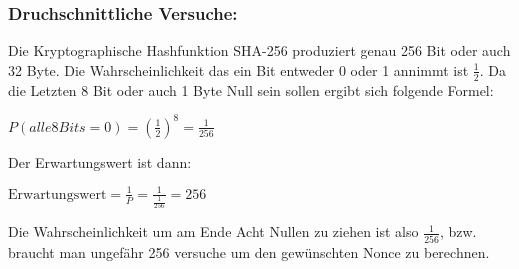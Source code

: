 \subsubsection*{Druchschnittliche Versuche:}

Die Kryptographische Hashfunktion SHA-256 produziert genau 256 Bit oder auch 32 Byte. Die Wahrscheinlichkeit das ein Bit entweder 0 oder 1 annimmt ist $\frac{1}{2}$. Da die Letzten 8 Bit oder auch 1 Byte Null sein sollen ergibt sich folgende Formel:\\

\begin{center}
$P(alle 8 Bits = 0)=(\frac{1}{2})^8 = \frac{1}{256}$
\end{center}

Der Erwartungswert ist dann:

\begin{center}
$\text{Erwartungswert}=\frac{1}{P}= \frac{1}{\frac{1}{256}} = 256$
\end{center}

Die Wahrscheinlichkeit um am Ende Acht Nullen zu ziehen ist also $\frac{1}{256}$, bzw. braucht man ungefähr 256 versuche um den gewünschten Nonce zu berechnen.